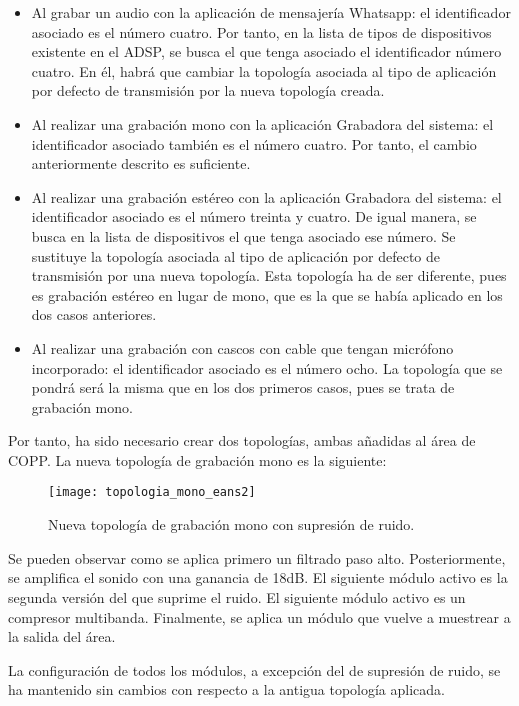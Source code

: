 \begin{itemize}
	\item{Al grabar un audio con la aplicación de mensajería Whatsapp: el identificador asociado es el número cuatro. Por tanto, en la lista de tipos de dispositivos existente en el \gls{ADSP}, se busca el que tenga asociado el identificador número cuatro. En él, habrá que cambiar la topología asociada al tipo de aplicación por defecto de transmisión por la nueva topología creada.}
	\item{Al realizar una grabación mono con la aplicación Grabadora del sistema: el identificador asociado también es el número cuatro. Por tanto, el cambio anteriormente descrito es suficiente.}
	\item{Al realizar una grabación estéreo con la aplicación Grabadora del sistema: el identificador asociado es el número treinta y cuatro. De igual manera, se busca en la lista de dispositivos el que tenga asociado ese número. Se sustituye la topología asociada al tipo de aplicación por defecto de transmisión por una nueva topología. Esta topología ha de ser diferente, pues es grabación estéreo en lugar de mono, que es la que se había aplicado en los dos casos anteriores.}
	\item{Al realizar una grabación con cascos con cable que tengan micrófono incorporado: el identificador asociado es el número ocho. La topología que se pondrá será la misma que en los dos primeros casos, pues se trata de grabación mono.}
\end{itemize}

Por tanto, ha sido necesario crear dos topologías, ambas añadidas al área de \gls{COPP}. La nueva topología de grabación mono es la siguiente:

\begin{figure}[H]
	\centering
	\texttt{[image: topologia\_mono\_eans2]}
	\caption{Nueva topología de grabación mono con supresión de ruido.} 
	\label{fig:mono_eans2}
\end{figure}

Se pueden observar como se aplica primero un filtrado paso alto. Posteriormente, se amplifica el sonido con una ganancia de 18\gls{dB}. El siguiente módulo activo es la segunda versión del que suprime el ruido. El siguiente módulo activo es un compresor multibanda. Finalmente, se aplica un módulo que vuelve a muestrear a la salida del área.

La configuración de todos los módulos, a excepción del de supresión de ruido, se ha mantenido sin cambios con respecto a la antigua topología aplicada.

